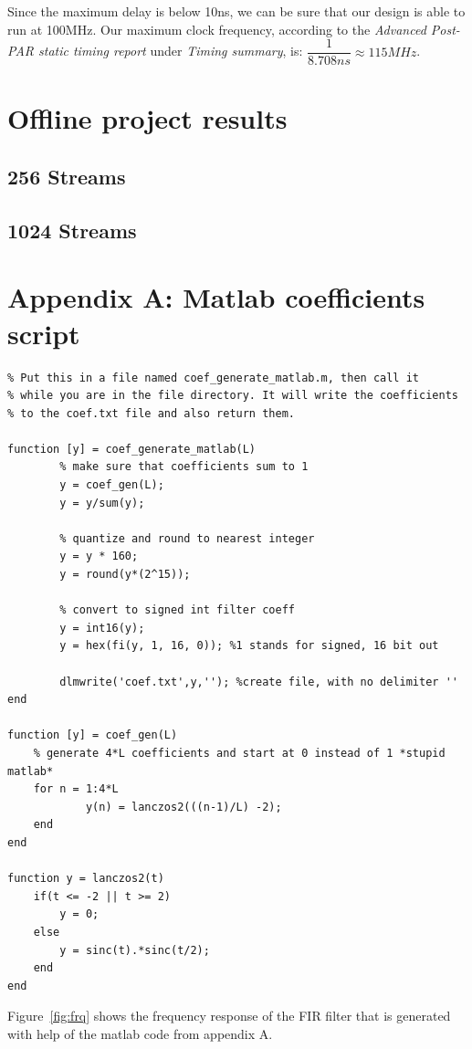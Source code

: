 \documentclass[a4paper,twoside,11pt, fleqn]{article}
\begin{document}
Since the maximum delay is below 10ns, we can be sure that our design is able to run at 100MHz. Our maximum clock frequency, according to the \textit{Advanced Post-PAR static timing report} under \textit{Timing summary}, is: $\dfrac{1}{8.708ns} \approx 115MHz$. 
   
\newpage
\section{Offline project results}
\subsection{256 Streams}
\subsection{1024 Streams}

\newpage
\section{Appendix A: Matlab coefficients script}
\begin{lstlisting}
% Put this in a file named coef_generate_matlab.m, then call it 
% while you are in the file directory. It will write the coefficients
% to the coef.txt file and also return them.

function [y] = coef_generate_matlab(L)
        % make sure that coefficients sum to 1
        y = coef_gen(L);
        y = y/sum(y);

        % quantize and round to nearest integer
        y = y * 160;
        y = round(y*(2^15)); 
             
        % convert to signed int filter coeff
        y = int16(y);
        y = hex(fi(y, 1, 16, 0)); %1 stands for signed, 16 bit out
        
        dlmwrite('coef.txt',y,''); %create file, with no delimiter ''      
end

function [y] = coef_gen(L)
    % generate 4*L coefficients and start at 0 instead of 1 *stupid matlab*
    for n = 1:4*L
            y(n) = lanczos2(((n-1)/L) -2);
    end
end

function y = lanczos2(t)
    if(t <= -2 || t >= 2)
        y = 0;
    else
        y = sinc(t).*sinc(t/2);
    end
end
\end{lstlisting}

Figure~\ref{fig:frq} shows the frequency response of the FIR filter that is generated with help of the matlab code from appendix A.
\end{document}
